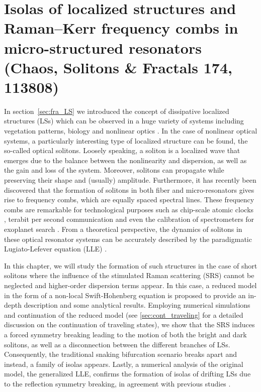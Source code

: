 \chapter{Isolas of localized structures and Raman–Kerr frequency combs in micro-structured resonators (Chaos, Solitons \& Fractals 174, 113808)}

In section~\ref{sec:fra_LS} we introduced the concept of dissipative 
localized structures (LSs) which can be observed in a huge variety
of systems including vegetation patterns, biology and 
nonlinear optics \cite{tlidi2014localized,heimburg2005soliton}. In the case of nonlinear optical systems,
a particularly interesting type of localized structure can be found,
the so-called optical solitons. Loosely speaking, a soliton
is a localized wave that emerges due to the balance between the nonlinearity
and dispersion, as well as the gain and loss of the system. Moreover,
solitons can propagate while preserving their shape and (usually) amplitude.
Furthermore, it has recently been discovered that the formation of solitons
in both fiber and micro-resonators gives rise to frequency combs, which are equally
spaced spectral lines. These frequency combs are remarkable
for technological purposes such as chip-scale atomic clocks \cite{Jost2015clock}, terabit
per second communication \cite{marin2017microresonator} and even the calibration of spectrometers
for exoplanet search \cite{suh2019searching}. From a theoretical perspective, the dynamics
of solitons in these optical resonator systems can be accurately described 
by the paradigmatic Lugiato-Lefever equation (LLE) \cite{lugiatolefever1987}.

In this chapter, we will study the formation of such structures in the
case of short solitons where the influence of the stimulated Raman scattering (SRS)
cannot be neglected and higher-order dispersion terms appear. In this case, a reduced model
in the form of a non-local Swift-Hohenberg equation is proposed to provide an
in-depth description and some analytical results. Employing numerical simulations and
continuation of the reduced model (see \ref{sec:cont_traveling} for a detailed discussion on the
continuation of traveling states), we show that the SRS induces a forced symmetry
breaking leading to the motion of both the bright and dark solitons, as well as a disconnection between 
the different branches of LSs. Consequently, the traditional snaking bifurcation scenario breaks
apart and instead, a family of isolas appears. Lastly, a numerical analysis of the
original model, the generalized LLE, confirms the formation of isolas of drifting LSs due
to the reflection symmetry breaking, in agreement with previous studies \cite{burke2009swift,parra2014third}.


